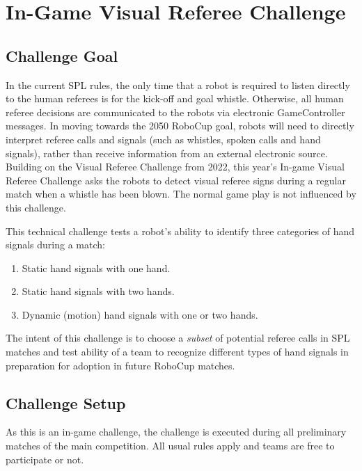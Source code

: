 \section{In-Game Visual Referee Challenge}

\subsection{Challenge Goal}

In the current SPL rules, the only time that a robot is required to listen directly to the human referees is for the kick-off and goal whistle. Otherwise, all human referee decisions are communicated to the robots via electronic GameController messages. In moving towards the 2050 RoboCup goal, robots will need to directly interpret referee calls and signals (such as whistles, spoken calls and hand signals), rather than receive information from an external electronic source.
Building on the Visual Referee Challenge from 2022, this year's In-game Visual Referee Challenge asks the robots to detect visual referee signs during a regular match when a whistle has been blown. The normal game play is not influenced by this challenge.

This technical challenge tests a robot's ability to identify three categories of hand signals during a match:
\begin{enumerate}
    \item Static hand signals with one hand.
    \item Static hand signals with two hands.
    \item Dynamic (motion) hand signals with one or two hands.
\end{enumerate}

The intent of this challenge is to choose a \emph{subset} of potential referee calls in SPL matches and test ability of a team to recognize different types of hand signals in preparation for adoption in future RoboCup matches.

\subsection{Challenge Setup}

As this is an in-game challenge, the challenge is executed during all preliminary matches of the main competition. All usual rules apply and teams are free to participate or not.

